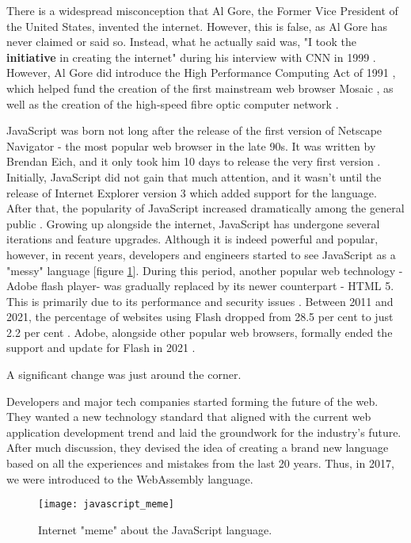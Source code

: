 There is a widespread misconception that Al Gore, the Former Vice President of the United States, invented the internet. However, this is false, as Al Gore has never claimed or said so. Instead, what he actually said was, "I took the \textbf{initiative} in creating the internet" during his interview with CNN in 1999 \cite{int7}. However, Al Gore did introduce the High Performance Computing Act of 1991 \cite{int8}, which helped fund the creation of the first mainstream web browser Mosaic \cite{int9}, as well as the creation of the high-speed fibre optic computer network \cite{int10}.

JavaScript was born not long after the release of the first version of Netscape Navigator - the most popular web browser in the late 90s. It was written by Brendan Eich, and it only took him 10 days to release the very first version \cite{int11}. Initially, JavaScript did not gain that much attention, and it wasn't until the release of Internet Explorer version 3 which added support for the language. After that, the popularity of JavaScript increased dramatically among the general public \cite{int12} \cite{int13}. Growing up alongside the internet, JavaScript has undergone several iterations and feature upgrades. Although it is indeed powerful and popular, however, in recent years, developers and engineers started to see JavaScript as a "messy" language [figure \ref{fig:javascript_meme}]. During this period, another popular web technology - Adobe flash player- was gradually replaced by its newer counterpart - HTML 5. This is primarily due to its performance and security issues \cite{int14}. Between 2011 and 2021, the percentage of websites using Flash dropped from 28.5 per cent to just 2.2 per cent \cite{int15}. Adobe, alongside other popular web browsers, formally ended the support and update for Flash in 2021 \cite{int16}.

A significant change was just around the corner.

Developers and major tech companies started forming the future of the web. They wanted a new technology standard that aligned with the current web application development trend and laid the groundwork for the industry's future. After much discussion, they devised the idea of creating a brand new language based on all the experiences and mistakes from the last 20 years. Thus, in 2017, we were introduced to the WebAssembly language.

\newpage
\bigskip
\begin{figure}[hp]
\centering
\texttt{[image: javascript\_meme]}
\caption{\footnotesize{Internet "meme" about the JavaScript language. \cite{inta1}}}
\captionsetup{aboveskip=0pt,font=it}
\label{fig:javascript_meme}
\end{figure}
\bigskip

